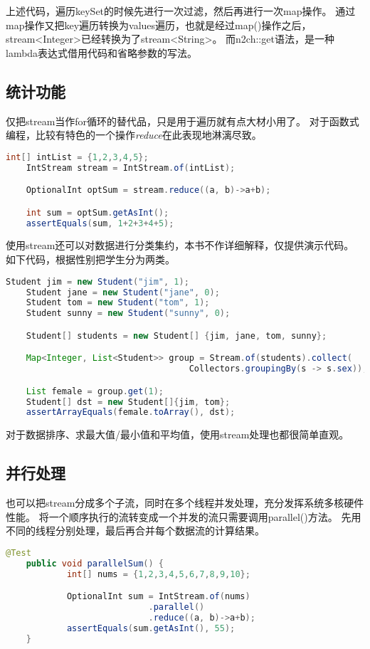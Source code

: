 上述代码，遍历keySet的时候先进行一次过滤，然后再进行一次map操作。
通过map操作又把key遍历转换为values遍历，也就是经过map()操作之后，
stream<Integer>已经转换为了stream<String>。
而n2ch::get语法，是一种lambda表达式借用代码和省略参数的写法。

\subsection{统计功能}
仅把stream当作for循环的替代品，只是用于遍历就有点大材小用了。
对于函数式编程，比较有特色的一个操作\emph{reduce}在此表现地淋漓尽致。
\begin{lstlisting}[language=Java]
	int[] intList = {1,2,3,4,5};
	IntStream stream = IntStream.of(intList);

	OptionalInt optSum = stream.reduce((a, b)->a+b);

	int sum = optSum.getAsInt();
	assertEquals(sum, 1+2+3+4+5);
\end{lstlisting}

使用stream还可以对数据进行分类集约，本书不作详细解释，仅提供演示代码。
如下代码，根据性别把学生分为两类。

\begin{lstlisting}[language=Java]
	Student jim = new Student("jim", 1);
	Student jane = new Student("jane", 0);
	Student tom = new Student("tom", 1);
	Student sunny = new Student("sunny", 0);

	Student[] students = new Student[] {jim, jane, tom, sunny};

	Map<Integer, List<Student>> group = Stream.of(students).collect(
									Collectors.groupingBy(s -> s.sex));

	List female = group.get(1);
	Student[] dst = new Student[]{jim, tom};
	assertArrayEquals(female.toArray(), dst);
\end{lstlisting}

对于数据排序、求最大值/最小值和平均值，使用stream处理也都很简单直观。

\subsection{并行处理}
也可以把stream分成多个子流，同时在多个线程并发处理，充分发挥系统多核硬件性能。
将一个顺序执行的流转变成一个并发的流只需要调用parallel()方法。
先用不同的线程分别处理，最后再合并每个数据流的计算结果。

\begin{lstlisting}[language=Java]
	@Test
	public void parallelSum() {
			int[] nums = {1,2,3,4,5,6,7,8,9,10};

			OptionalInt sum = IntStream.of(nums)
							.parallel()
							.reduce((a, b)->a+b);
			assertEquals(sum.getAsInt(), 55);
	}
\end{lstlisting}

